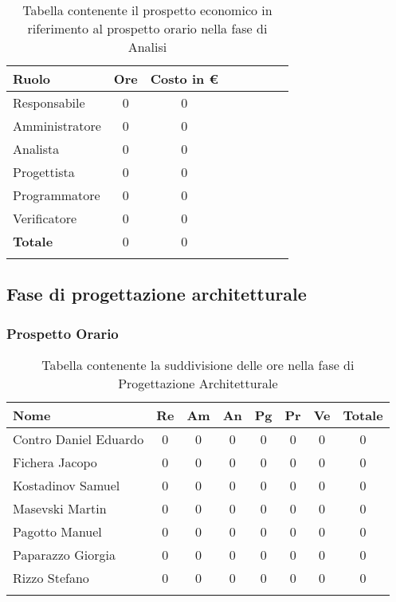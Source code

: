 \documentclass[../piano_di_progetto.tex]{subfiles}
\begin{document}
\begin{center}
	\begin{longtable}{|l|c|c|c|c|c|c|c|}
		\hline
		\rowcolor{lightgray}
		\textbf{Ruolo} & \textbf{Ore} & \textbf{Costo in €}\\

		\hline
		Responsabile & 0 & 0\\
		\hline
		Amministratore & 0 & 0\\
		\hline
		Analista & 0 & 0\\
		\hline
		Progettista & 0 & 0\\
		\hline
		Programmatore & 0 & 0\\
		\hline
		Verificatore & 0 & 0\\
		\hline
		\textbf{Totale} & 0 & 0\\
		\hline
		\caption{Tabella contenente il prospetto economico in riferimento al prospetto orario nella fase di Analisi}
	\end{longtable}
\end{center}

\subsection{ Fase di progettazione architetturale}%
\label{sub:fase_prog_arc}
\subsubsection{Prospetto Orario}

\begin{center}
	\begin{longtable}{|l|c|c|c|c|c|c|c|}
		\hline
		\rowcolor{lightgray}
		\textbf{Nome} & \textbf{Re} & \textbf{Am} & \textbf{An} & \textbf{Pg}  & \textbf{Pr}   & \textbf{Ve} & \textbf{Totale} \\

		\hline
			Contro Daniel Eduardo & 0 &0&0&0&0&0 & 0 \\
		\hline
			Fichera Jacopo &  0 &0&0&0&0&0 & 0 \\
		\hline
			Kostadinov Samuel &  0 &0&0&0&0&0 & 0 \\			
		\hline
			Masevski Martin 	&  0 &0&0&0&0&0 & 0\\
		\hline
			Pagotto Manuel &  0 &0&0&0&0&0 & 0 \\			
		\hline
			Paparazzo Giorgia &  0 &0&0&0&0&0 & 0 \\
		\hline
			Rizzo Stefano &  0 &0&0&0&0&0 & 0\\
		\hline	

		\caption{Tabella contenente la suddivisione delle ore nella fase di Progettazione Architetturale}
	\end{longtable}
\end{center}
\end{document}
